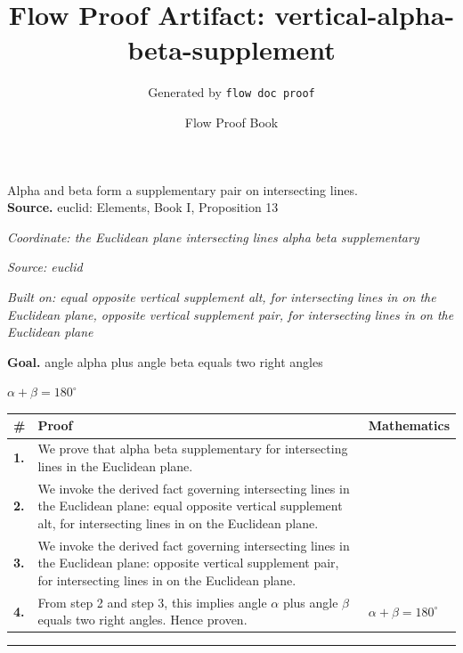\documentclass[11pt]{article}
\title{Flow Proof Artifact: vertical-alpha-beta-supplement}
\author{Generated by \texttt{flow doc proof}}
\date{Flow Proof Book}
\theoremstyle{definition}
\begin{document}
\maketitle
Alpha and beta form a supplementary pair on intersecting lines.\\[0.5em]
\textbf{Source.} euclid: Elements, Book I, Proposition 13\\[0.5em]
\bigskip
{}\par
\smallskip\noindent\textit{Coordinate: the Euclidean plane \cdot intersecting lines \cdot alpha beta supplementary}\par
\smallskip\noindent\textit{Source: euclid}\par
\smallskip\noindent\textit{Built on: equal opposite vertical supplement alt, for intersecting lines in on the Euclidean plane, opposite vertical supplement pair, for intersecting lines in on the Euclidean plane}\par
\medskip
\noindent\textbf{Goal.} angle alpha plus angle beta equals two right angles\par
\noindent$\displaystyle \alpha + \beta = 180^\circ$\par
\medskip
\noindent
\begin{tabular}{@{} >{\raggedright\arraybackslash}p{} >{\raggedright\arraybackslash}p{} >{\raggedleft\arraybackslash}p{} @{}}
\textbf{\#} & \textbf{Proof} & \textbf{Mathematics} \\
\midrule
\textbf{1.} & We prove that alpha beta supplementary for intersecting lines in the Euclidean plane. & \\[0.45em]
\textbf{2.} & We invoke the derived fact governing intersecting lines in the Euclidean plane: equal opposite vertical supplement alt, for intersecting lines in on the Euclidean plane. & \\[0.45em]
\textbf{3.} & We invoke the derived fact governing intersecting lines in the Euclidean plane: opposite vertical supplement pair, for intersecting lines in on the Euclidean plane. & \\[0.45em]
\textbf{4.} & From step 2 and step 3, this implies angle $\alpha$ plus angle $\beta$ equals two right angles. Hence proven. & $\displaystyle \alpha + \beta = 180^\circ$ \\[0.45em]
\bottomrule
\end{tabular}
\label{thm:Geometry-intersecting lines-alpha_beta_supplementary}
\par\medskip\hrule
\end{document}
